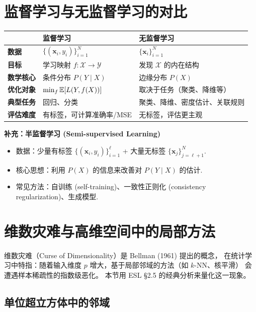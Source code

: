\section{监督学习与无监督学习的对比}

\begin{center}
\renewcommand{\arraystretch}{1.6}
\begin{tabular}{p{3cm}|p{6cm}|p{6cm}}
\toprule
& \textbf{监督学习} & \textbf{无监督学习} \\
\midrule
\textbf{数据}    & $\{(\mathbf{x}_i, y_i)\}_{i=1}^{N}$ & $\{\mathbf{x}_i\}_{i=1}^{N}$ \\
\textbf{目标}    & 学习映射 $f: \mathcal{X} \to \mathcal{Y}$ & 发现 $\mathcal{X}$ 的内在结构 \\
\textbf{数学核心} & 条件分布 $P(Y \mid X)$ & 边缘分布 $P(X)$ \\
\textbf{优化对象} & $\min_f \mathbb{E}[L(Y, f(X))]$ & 取决于任务（聚类、降维等） \\
\textbf{典型任务} & 回归、分类 & 聚类、降维、密度估计、关联规则 \\
\textbf{评估难度} & 有标签，可计算准确率/MSE & 无标签，评估更主观 \\
\bottomrule
\end{tabular}
\end{center}

\medskip
\textbf{补充：半监督学习 (Semi-supervised Learning)}
\begin{itemize}
    \item 数据：少量有标签 $\{(\mathbf{x}_i, y_i)\}_{i=1}^{\ell}$ + 大量无标签 $\{\mathbf{x}_j\}_{j=\ell+1}^{N}$.
    \item 核心思想：利用 $P(X)$ 的信息来改善对 $P(Y \mid X)$ 的估计.
    \item 常见方法：自训练 (self-training)、一致性正则化 (consistency regularization)、生成模型.
\end{itemize}

\section{维数灾难与高维空间中的局部方法}

维数灾难（Curse of Dimensionality）是 Bellman (1961) 提出的概念，
在统计学习中特指：随着输入维度 $p$ 增大，基于局部邻域的方法（如 $k$-NN、核平滑）
会遭遇样本稀疏性的指数级恶化。
本节用 ESL \S 2.5 的经典分析来量化这一现象。

\subsection{单位超立方体中的邻域}

